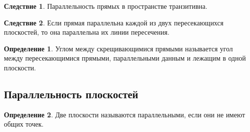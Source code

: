 \documentclass[12pt]{article}
\theoremstyle{definition}
\newtheorem{definition}{Определение}
\newtheorem{consequence}{Следствие}[subsection]
\begin{document}
    \begin{consequence}
        Параллельность прямых в пространстве транзитивна.
    \end{consequence}
    \begin{consequence}
        Если прямая параллельна каждой из двух пересекающихся плоскостей,
    то она параллельна их линии пересечения.
    \end{consequence}
    \begin{definition}
        Углом между скрещивающимися прямыми называется угол между пересекающимися прямыми, параллельными данным и лежащим в одной плоскости.
    \end{definition}

    \setcounter{subsection}{4}
    \setcounter{consequence}{0}
    
    \subsection{Параллельность плоскостей}
    
    \begin{definition}
        Две плоскости называются параллельными, если они не имеют общих точек.
    \end{definition}
    
\end{document}
